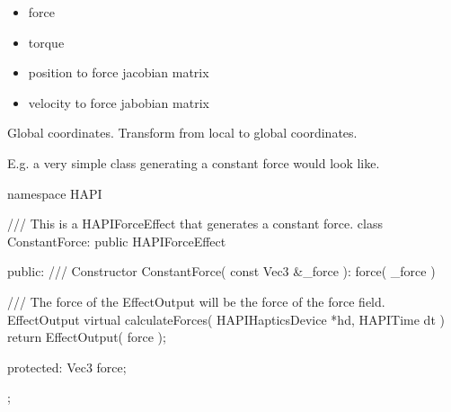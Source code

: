 \begin{itemize}
\item force
\item torque
\item position to force jacobian matrix
\item velocity to force jabobian matrix
\end{itemize}

Global coordinates. Transform from local to global coordinates.

E.g. a very simple class generating a constant force would look like.

namespace HAPI {
  /// This is a HAPIForceEffect that generates a constant force.
  class ConstantForce: public HAPIForceEffect {
  public:
    /// Constructor
    ConstantForce( const Vec3 &_force ): 
      force( _force ) {}

    /// The force of the EffectOutput will be the force of the force field. 
    EffectOutput virtual calculateForces( HAPIHapticsDevice *hd,
                                          HAPITime dt ) {
      return EffectOutput( force );
    }
    
  protected:
    Vec3 force;
  };
}



